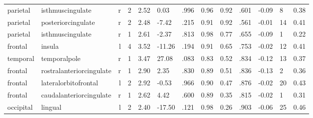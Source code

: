 \documentclass{article}
\begin{document}
\begin{longtable}{llrR{1.3cm}R{1cm}R{1.3cm}R{1cm}R{1cm}R{1.3cm}R{1cm}R{1.8cm}R{1.3cm}R{1.8cm}}
  parietal &          isthmuscingulate &    r &         2 &                  2.52 &             0.03 &               .996 &                               0.96 &                          0.92 &                            .601 &  -0.09 &      8 &      0.38 \\
  parietal &        posteriorcingulate &    r &         2 &                  2.48 &            -7.42 &               .215 &                               0.91 &                          0.92 &                            .561 &  -0.01 &     14 &      0.41 \\
  parietal &          isthmuscingulate &    r &         1 &                  2.61 &            -2.37 &               .813 &                               0.98 &                          0.77 &                            .655 &  -0.09 &      1 &      0.22 \\
   frontal &                    insula &    l &         4 &                  3.52 &           -11.26 &               .194 &                               0.91 &                          0.65 &                            .753 &  -0.02 &     12 &      0.41 \\
  temporal &              temporalpole &    r &         1 &                  3.47 &            27.08 &               .083 &                               0.83 &                          0.52 &                            .834 &  -0.12 &     13 &      0.37 \\
   frontal &  rostralanteriorcingulate &    r &         1 &                  2.90 &             2.35 &               .830 &                               0.89 &                          0.51 &                            .836 &  -0.13 &      2 &      0.36 \\
   frontal &      lateralorbitofrontal &    l &         2 &                  2.92 &            -0.53 &               .966 &                               0.90 &                          0.47 &                            .876 &  -0.02 &     20 &      0.43 \\
   frontal &   caudalanteriorcingulate &    r &         1 &                  2.62 &             4.42 &               .600 &                               0.89 &                          0.35 &                            .815 &  -0.02 &      1 &      0.31 \\
 occipital &                   lingual &    l &         2 &                  2.40 &           -17.50 &               .121 &                               0.98 &                          0.26 &                            .903 &  -0.06 &     25 &      0.46 \\

\end{longtable}
\end{document}
